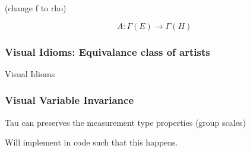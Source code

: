 \documentclass[../intro.tex]{subfiles}
\begin{document}
(change f to rho)

\begin{equation}
    A: \Gamma(E) \rightarrow \Gamma(H)
\end{equation}

\subsubsection{Visual Idioms: Equivalance class of artists}
Visual Idioms

\subsubsection{Visual Variable Invariance}
Tau can preserves the measurement type properties (group scales)

Will implement in code such that this happens. 
\end{document}
